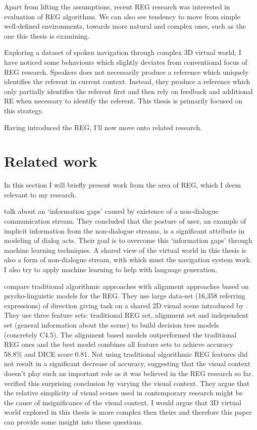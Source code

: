 Apart from lifting the assumptions, recent REG research was interested in evaluation of REG algorithms. We can also see tendency to move from simple well-defined environments, towards more natural and complex ones, such as the one this thesis is examining.

Exploring a dataset of spoken navigation through complex 3D virtual world, I have noticed some behaviours which slightly deviates from conventional focus of REG research. Speakers does not necessarily produce a reference which uniquely identifies the referent in current context. Instead, they produce a reference which only partially identifies the referent first and then rely on feedback and additional RE when necessary to identify the referent. This thesis is primarily focused on this strategy.

Having introduced the REG, I'll now move onto related research.

\section{Related work}
\label{sec:relwork}
In this section I will briefly present work from the area of REG, which I deem relevant to my research.

\citet{ha2012combining} talk about an `information gaps' caused by existence of a non-dialogue communication stream. They concluded that the posture of user, an example of implicit information from the non-dialogue streams, is a significant attribute in modeling of dialog acts. Their goal is to overcome this `information gaps' through machine learning techniques. A shared view of the virtual world in this thesis is also a form of non-dialogue stream, with which must the navigation system work. I also try to apply machine learning to help with language generation.

\citet{viethen2011generating} compare traditional algorithmic approaches with alignment approaches based on psycho-linguistic models for the REG. They use large data-set (16,358 referring expressions) of direction giving task on a shared 2D visual scene introduced by \citet{louwerse2007multimodal}. They use three feature sets: traditional REG set, alignment set and independent set (general information about the scene) to build decision tree models (concretely C4.5). The alignment based models outperformed the traditional REG ones and the best model combines all feature sets to achieve accuracy 58.8\% and DICE score 0.81. Not using traditional algorithmic REG features did not result in a significant decrease of accuracy, suggesting that the visual context doesn't play such an important role as it was believed in the REG research so far.  \citet{viethen2011impact} verified this surprising conclusion by varying the visual context. They argue that the relative simplicity of visual scenes used in contemporary research might be the cause of insignificance of the visual context. I would argue that 3D virtual world explored in this thesis is more complex then theirs and therefore this paper can provide some insight into these questions.  

